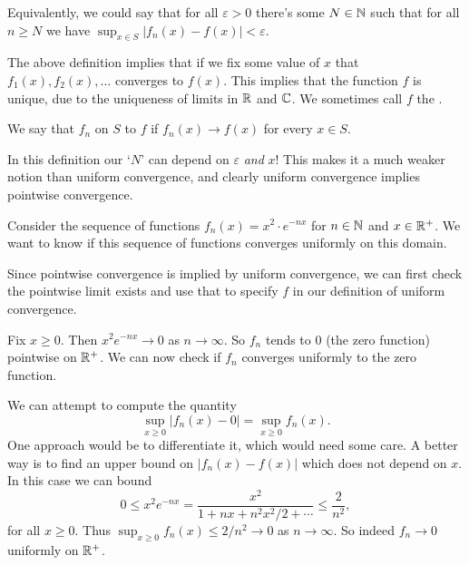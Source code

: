 \documentclass[a4paper]{scrartcl}
\begin{document}
\begin{center}
    

\end{center}


Equivalently, we could say that for all $\varepsilon > 0$ there's some $N \in \mathbb{N}$ such that for all $n \geq N$ we have $\sup_{x \in S} |f_n(x) - f(x)| < \varepsilon$.

The above definition implies that if we fix some value of $x$ that $f_1(x), f_2(x), \dots$ converges to $f(x)$. This implies that the function $f$ is unique, due to the uniqueness of limits in $\mathbb{R}$ and $\mathbb{C}$. We sometimes call $f$ the .

\begin{definition}
We say that $f_n$  on $S$ to $f$ if $f_n(x) \rightarrow f(x)$ for every $x \in S$.
\end{definition}
\begin{remark}
    In this definition our `$N$' can depend on $\varepsilon$ \emph{and} $x$! This makes it a much weaker notion than uniform convergence, and clearly uniform convergence implies pointwise convergence.
\end{remark}

\begin{example}
    Consider the sequence of functions $f_n(x) = x^2 \cdot e^{-n x}$ for $n \in \mathbb{N}$ and $x \in \mathbb{R}^+$. We want to know if this sequence of functions converges uniformly on this domain.

    Since pointwise convergence is implied by uniform convergence, we can first check the pointwise limit exists and use that to specify $f$ in our definition of uniform convergence.

    Fix $x \geq 0$. Then $x^2 e^{-nx} \rightarrow 0$ as $n \rightarrow \infty$. So $f_n$ tends to $0$ (the zero function) pointwise on $\mathbb{R}^+$. We can now check if $f_n$ converges uniformly to the zero function.

    We can attempt to compute the quantity
    $$
    \sup_{x \geq 0} |f_n(x) - 0| =  \sup_{x \geq 0} f_n(x).
    $$
    One approach would be to differentiate it, which would need some care. A better way is to find an upper bound on $|f_n(x) - f(x)|$ which does not depend on $x$. In this case we can bound
    $$
    0 \leq x^2 e^{-nx} = \frac{x^2}{1 + nx + n^2x^2/2 + \cdots} \leq \frac{2}{n^2},
    $$
    for all $x \geq 0$. Thus $\sup_{x \geq 0} f_n(x) \leq 2/n^2 \rightarrow 0$ as $n \rightarrow \infty$. So indeed $f_n \rightarrow 0$ uniformly on $\mathbb{R}^+$.
\end{example}
\end{document}
